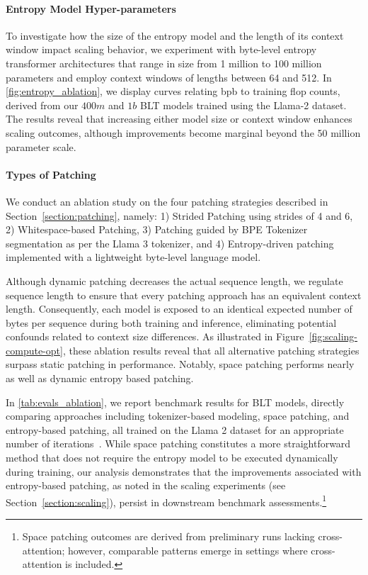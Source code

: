 \paragraph{Entropy Model Hyper-parameters} To investigate how the size of the entropy model and the length of its context window impact scaling behavior, we experiment with byte-level entropy transformer architectures that range in size from 1 million to 100 million parameters and employ context windows of lengths between 64 and 512. In \autoref{fig:entropy_ablation}, we display curves relating bpb to training flop counts, derived from our $400m$ and $1b$ {\textsc BLT} models trained using the Llama-2 dataset. The results reveal that increasing either model size or context window enhances scaling outcomes, although improvements become marginal beyond the 50 million parameter scale.

\paragraph{Types of Patching}

We conduct an ablation study on the four patching strategies described in Section~\ref{section:patching}, namely: 1) Strided Patching using strides of 4 and 6, 2) Whitespace-based Patching, 3) Patching guided by BPE Tokenizer segmentation as per the Llama 3 tokenizer, and 4) Entropy-driven patching implemented with a lightweight byte-level language model.

Although dynamic patching decreases the actual sequence length, we regulate sequence length to ensure that every patching approach has an equivalent context length. Consequently, each model is exposed to an identical expected number of bytes per sequence during both training and inference, eliminating potential confounds related to context size differences. As illustrated in Figure~\ref{fig:scaling-compute-opt}, these ablation results reveal that all alternative patching strategies surpass static patching in performance. Notably, space patching performs nearly as well as dynamic entropy based patching.

In \autoref{tab:evals_ablation}, we report benchmark results for {\textsc BLT} models, directly comparing approaches including tokenizer-based modeling, space patching, and entropy-based patching, all trained on the Llama 2 dataset for an appropriate number of iterations~\citep{dubey2024llama}. While space patching constitutes a more straightforward method that does not require the entropy model to be executed dynamically during training, our analysis demonstrates that the improvements associated with entropy-based patching, as noted in the scaling experiments (see Section~\ref{section:scaling}), persist in downstream benchmark assessments.\footnote{Space patching outcomes are derived from preliminary runs lacking cross-attention; however, comparable patterns emerge in settings where cross-attention is included.}

